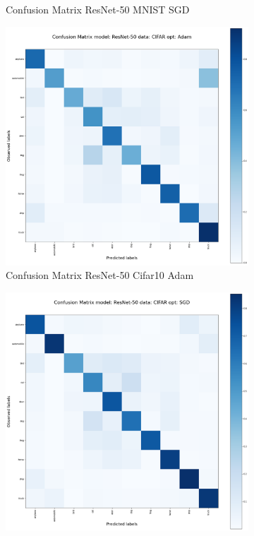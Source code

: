 \documentclass[conference]{IEEEtran}
\begin{document}
\begin{figure}[!htbp]
\begin{subfigure}[b]{0.22\textwidth}
        \caption{Confusion Matrix ResNet-50 MNIST SGD}
        \label{fig:x matrix_ResNet_MNIST_SGD}
    \end{subfigure}
    \begin{subfigure}[b]{0.22\textwidth}
        \centering
        \includegraphics[width=\textwidth]{img/matrix_resnet_CIFAR_Adam.png}
        \caption{Confusion Matrix ResNet-50 Cifar10 Adam}
        \label{fig:x matrix_ResNet_CIFAR_Adam}
    \end{subfigure}
    \hfill
    \begin{subfigure}[b]{0.22\textwidth}
        \centering
        \includegraphics[width=\textwidth]{img/matrix_resnet_CIFAR_SGD.png}

\end{subfigure}
\end{figure}
\end{document}
